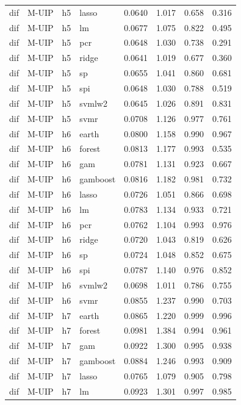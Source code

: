 \begin{ThreePartTable}
\begin{longtable}[t]{llclcccc}
dif & M-UIP & h5 & lasso & 0.0640 & 1.017 & 0.658 & 0.316\\
dif & M-UIP & h5 & lm & 0.0677 & 1.075 & 0.822 & 0.495\\
dif & M-UIP & h5 & pcr & 0.0648 & 1.030 & 0.738 & 0.291\\
dif & M-UIP & h5 & ridge & 0.0641 & 1.019 & 0.677 & 0.360\\
dif & M-UIP & h5 & sp & 0.0655 & 1.041 & 0.860 & 0.681\\
dif & M-UIP & h5 & spi & 0.0648 & 1.030 & 0.788 & 0.519\\
dif & M-UIP & h5 & svmlw2 & 0.0645 & 1.026 & 0.891 & 0.831\\
dif & M-UIP & h5 & svmr & 0.0708 & 1.126 & 0.977 & 0.761\\
\addlinespace
dif & M-UIP & h6 & earth & 0.0800 & 1.158 & 0.990 & 0.967\\
dif & M-UIP & h6 & forest & 0.0813 & 1.177 & 0.993 & 0.535\\
dif & M-UIP & h6 & gam & 0.0781 & 1.131 & 0.923 & 0.667\\
dif & M-UIP & h6 & gamboost & 0.0816 & 1.182 & 0.981 & 0.732\\
dif & M-UIP & h6 & lasso & 0.0726 & 1.051 & 0.866 & 0.698\\
dif & M-UIP & h6 & lm & 0.0783 & 1.134 & 0.933 & 0.721\\
dif & M-UIP & h6 & pcr & 0.0762 & 1.104 & 0.993 & 0.976\\
dif & M-UIP & h6 & ridge & 0.0720 & 1.043 & 0.819 & 0.626\\
dif & M-UIP & h6 & sp & 0.0724 & 1.048 & 0.852 & 0.675\\
dif & M-UIP & h6 & spi & 0.0787 & 1.140 & 0.976 & 0.852\\
dif & M-UIP & h6 & svmlw2 & 0.0698 & 1.011 & 0.786 & 0.755\\
dif & M-UIP & h6 & svmr & 0.0855 & 1.237 & 0.990 & 0.703\\
\addlinespace
dif & M-UIP & h7 & earth & 0.0865 & 1.220 & 0.999 & 0.996\\
dif & M-UIP & h7 & forest & 0.0981 & 1.384 & 0.994 & 0.961\\
dif & M-UIP & h7 & gam & 0.0922 & 1.300 & 0.995 & 0.938\\
dif & M-UIP & h7 & gamboost & 0.0884 & 1.246 & 0.993 & 0.909\\
dif & M-UIP & h7 & lasso & 0.0765 & 1.079 & 0.905 & 0.798\\
dif & M-UIP & h7 & lm & 0.0923 & 1.301 & 0.997 & 0.985\\

\end{longtable}
\end{ThreePartTable}
